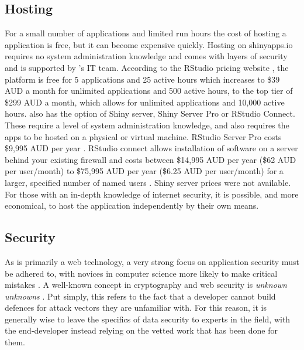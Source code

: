 \subsection{Hosting}

For a small number of applications and limited run hours the cost of hosting a  application is free, but it can become expensive quickly.  Hosting on shinyapps.io requires no system administration knowledge and comes with layers of security and is supported by 's IT team.  According to the RStudio pricing website \citep{core_team_rstudio_2012}, the platform is free for 5 applications and 25 active hours which increases to \$39 AUD a month for unlimited applications and 500 active hours, to the top tier of \$299 AUD a month, which allows for unlimited applications and 10,000 active hours.   also has the option of Shiny server, Shiny Server Pro or RStudio Connect.  These require a level of system administration knowledge, and also requires the apps to be hosted on a physical or virtual machine.  RStudio Server Pro costs \$9,995 AUD per year \citep{core_team_rstudio_2012}.  RStudio connect allows installation of software on a server behind your existing firewall and costs between \$14,995 AUD per year (\$62 AUD per user/month) to \$75,995 AUD per year (\$6.25 AUD per user/month) for a larger, specified number of named users \citep{core_team_rstudio_2012}.  Shiny server prices were not available.  For those with an in-depth knowledge of internet security, it is possible, and more economical, to host the application independently by their own means.

\subsection{Security}

As  is primarily a web technology, a very strong focus on application security must be adhered to, with novices in computer science more likely to make critical mistakes \citep{charpentier_web_2013}.  A well-known concept in cryptography and web security is \textit{unknown unknowns} \citep{charpentier_web_2013}.  Put simply, this refers to the fact that a developer cannot build defences for attack vectors they are unfamiliar with.  For this reason, it is generally wise to leave the specifics of data security to experts in the field, with the end-developer instead relying on the vetted work that has been done for them.

